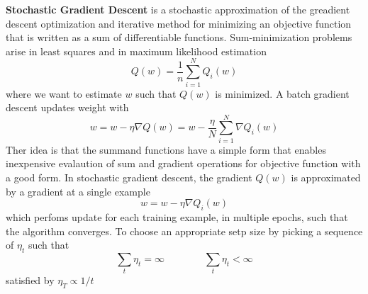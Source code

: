 \documentclass[11pt]{article}
\begin{document}
\begin{defn*}
    \textbf{Stochastic Gradient Descent} is a stochastic approximation of the greadient descent optimization and iterative method for minimizing an objective function that is written as a sum of differentiable functions. Sum-minimization problems arise in least squares and in maximum likelihood estimation 
    \[
        Q(w) = \frac{1}{n} \sum_{i=1}^N Q_i(w)    
    \]
    where we want to estimate $w$ such that $Q(w)$ is minimized. A batch gradient descent updates weight with 
    \[
        w = w - \eta \nabla Q(w) = w - \frac{\eta}{N} \sum_{i=1}^N \nabla Q_i(w)    
    \]
    Ther idea is that the summand functions have a simple form that enables inexpensive evalaution of sum and gradient operations for objective function with a good form. In stochastic gradient descent, the gradient $Q(w)$ is approximated by a gradient at a single example 
    \[
        w = w - \eta \nabla Q_i(w)    
    \]
    which perfoms update for each training example, in multiple epochs, such that the algorithm converges. To choose an appropriate setp size by picking a sequence of $\eta_t$ such that 
    \[
        \sum_t \eta_t = \infty 
        \quad \quad \quad \quad 
        \sum_t \eta_t < \infty    
    \]
    satisfied by $\eta_T \propto 1/t$
\end{defn*}
\end{document}
